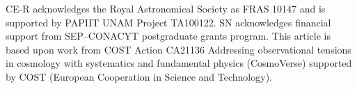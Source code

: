 \documentclass[onecolumn,superscriptaddress,secnumarabic,amssymb,amsmath,nobibnotes,aps,prd,nofootinbib,altaffilletter]{revtex4}
\begin{document}

\begin{acknowledgments}
CE-R acknowledges the Royal Astronomical Society as FRAS 10147 and is supported by PAPIIT UNAM Project TA100122. 
SN acknowledges financial support from SEP–CONACYT postgraduate grants program.
This article is based upon work from COST Action CA21136 Addressing observational tensions in cosmology with systematics and fundamental physics (CosmoVerse) supported by COST (European Cooperation in Science and Technology). 
\end{acknowledgments}


\nocite{*}


\end{document}
